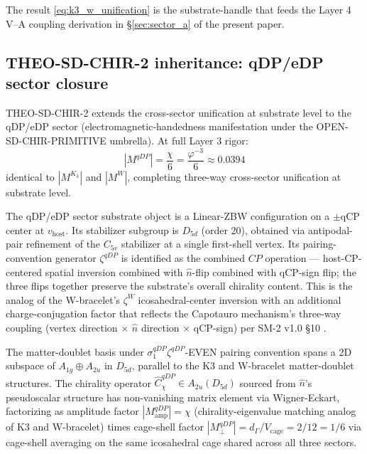\documentclass[11pt,letterpaper]{article}
\newcommand{\Cchi}{\hat{C}_\chi}
\newcommand{\Vcage}{V_{\text{cage}}}
\newcommand{\dGamma}{d_\Gamma}
\begin{document}
The result \eqref{eq:k3_w_unification} is the substrate-handle that feeds the Layer 4 V--A coupling derivation in §\ref{sec:sector_a} of the present paper.

\subsection{THEO-SD-CHIR-2 inheritance: qDP/eDP sector closure}
\label{sec:theo_sd_chir_2}

THEO-SD-CHIR-2 \cite{ResearchFrontier, Capotauro} extends the cross-sector unification at substrate level to the qDP/eDP sector (electromagnetic-handedness manifestation under the OPEN-SD-CHIR-PRIMITIVE umbrella). At full Layer 3 rigor:
\begin{equation}
\left| M^{qDP} \right| = \frac{\chi}{6} = \frac{\varphi^{-3}}{6} \approx 0.0394
\label{eq:qDP_chirality}
\end{equation}
identical to $|M^{K_3}|$ and $|M^W|$, completing three-way cross-sector unification at substrate level.

The qDP/eDP sector substrate object is a Linear-ZBW configuration on a $\pm$qCP center at $v_{\text{host}}$. Its stabilizer subgroup is $D_{5d}$ (order 20), obtained via antipodal-pair refinement of the $C_{5v}$ stabilizer at a single first-shell vertex. Its pairing-convention generator $\zeta^{qDP}$ is identified as the combined $CP$ operation \cite{Capotauro, SM2v1} --- host-CP-centered spatial inversion combined with $\hat{n}$-flip combined with qCP-sign flip; the three flips together preserve the substrate's overall chirality content. This is the analog of the W-bracelet's $\zeta^W$ icosahedral-center inversion with an additional charge-conjugation factor that reflects the Capotauro mechanism's three-way coupling (vertex direction $\times$ $\hat{n}$ direction $\times$ qCP-sign) per SM-2 v1.0 §10 \cite{SM2v1}.

The matter-doublet basis under $\sigma_1^{qDP} \zeta^{qDP}$-EVEN pairing convention spans a 2D subspace of $A_{1g} \oplus A_{2u}$ in $D_{5d}$, parallel to the K3 and W-bracelet matter-doublet structures. The chirality operator $\Cchi^{qDP} \in A_{2u}(D_{5d})$ sourced from $\hat{n}$'s pseudoscalar structure has non-vanishing matrix element via Wigner-Eckart, factorizing as amplitude factor $|M_{\text{amp}}^{qDP}| = \chi$ (chirality-eigenvalue matching analog of K3 and W-bracelet) times cage-shell factor $|M_\perp^{qDP}| = \dGamma/\Vcage = 2/12 = 1/6$ via cage-shell averaging on the same icosahedral cage shared across all three sectors.
\end{document}
